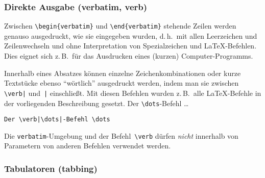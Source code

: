 \subsubsection{Direkte Ausgabe (verbatim, verb)}
Zwischen \verb|\begin{verbatim}| und \verb|\end{verbatim}|
stehende Zeilen werden genauso ausgedruckt, wie sie eingegeben
wurden, d.\,h.\ mit allen Leerzeichen und Zeilenwechseln und ohne
Interpretation von Spezialzeichen und \LaTeX-Befehlen.  Dies
eignet sich z.\,B.\ für das Ausdrucken eines (kurzen)
Computer-Programms.

Innerhalb eines Absatzes können einzelne Zeichenkombinationen
oder kurze Textstücke ebenso "`wörtlich"' ausgedruckt
werden, indem man sie zwischen \verb.\verb|. und~\verb.|.
einschließt.
Mit diesen Befehlen wurden z.\,B.\ alle \LaTeX-Befehle in der
vorliegenden Beschreibung gesetzt.
\exa
Der \verb|\dots|-Befehl \dots
\exb
\begin{verbatim}
Der \verb|\dots|-Befehl \dots
\end{verbatim}
\exc
 
Die \texttt{verbatim}-Umgebung und der Befehl~\verb|\verb|
dürfen \emph{nicht} innerhalb von Parametern von anderen Befehlen
verwendet werden.


 
\subsubsection{Tabulatoren (tabbing)} \label{tabbing}
 
